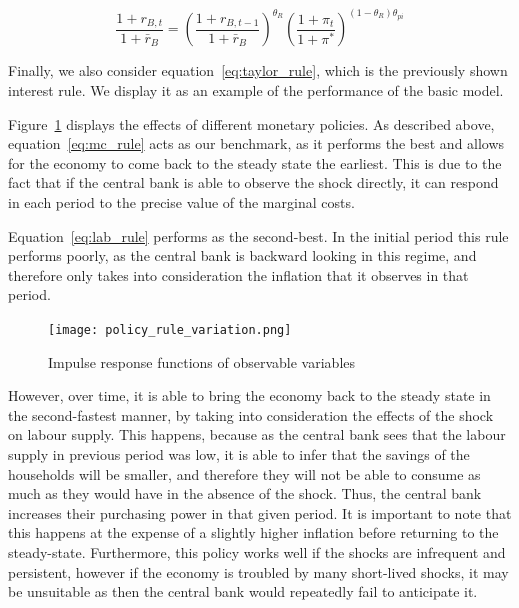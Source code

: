 \documentclass[12pt]{article}
\begin{document}
\begin{equation}\label{eq:taylor_rule}
    \frac{1 + r_{B,t}}{1 + \bar{r}_B} = \left( \frac{1 + r_{B,t-1}}{1 + \bar{r}_B} \right)^{\theta_R} \left( \frac{1 + \pi_t}{1 + \pi^*} \right)^{(1 - \theta_R)\theta_{pi}}
\end{equation}

Finally, we also consider equation~\ref{eq:taylor_rule}, which is the previously shown interest rule. We display it as an example of the performance of the basic model.  


Figure~\ref{fig:policy_rule_variation} displays the effects of different monetary policies. As described above, equation~\ref{eq:mc_rule} acts as our benchmark, as it performs the best and allows for the economy to come back to the steady state the earliest. This is due to the fact that if the central bank is able to observe the shock directly, it can respond in each period to the precise value of the marginal costs.

Equation~\ref{eq:lab_rule} performs as the second-best. In the initial period this rule performs poorly, as the central bank is backward looking in this regime, and therefore only takes into consideration the inflation that it observes in that period.  

\begin{figure}[!h]
    \caption{Impulse response functions of observable variables}\label{fig:policy_rule_variation}
    \centering
    \texttt{[image: policy\_rule\_variation.png]}
\end{figure}

However, over time, it is able to bring the economy back to the steady state in the second-fastest manner, by taking into consideration the effects of the shock on labour supply. This happens, because as the central bank sees that the labour supply in previous period was low, it is able to infer that the savings of the households will be smaller, and therefore they will not be able to consume as much as they would have in the absence of the shock. Thus, the central bank increases their purchasing power in that given period. It is important to note that this happens at the expense of a slightly higher inflation before returning to the steady-state. Furthermore, this policy works well if the shocks are infrequent and persistent, however if the economy is troubled by many short-lived shocks, it may be unsuitable as then the central bank would repeatedly fail to anticipate it.
\end{document}
